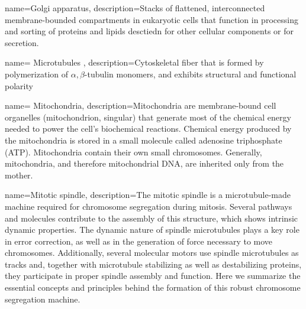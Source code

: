  {
	name={Golgi apparatus},
	description={Stacks of flattened, interconnected membrane-bounded compartments in eukaryotic cells that function in processing and sorting of proteins and lipids desctiedn for other cellular components or for secretion.\cite{lodish2003molecular}}}



 {
	name= {Microtubules} ,
	description={Cytoskeletal fiber that is formed by polymerization of $\alpha,\beta$-tubulin monomers, and exhibits structural and functional polarity\cite{lodish2003molecular}}}


 {
	name= {Mitochondria},
	description={Mitochondria are membrane-bound cell organelles (mitochondrion, singular) that generate most of the chemical energy needed to power the cell's biochemical reactions. Chemical energy produced by the mitochondria is stored in a small molecule called adenosine triphosphate (ATP). Mitochondria contain their own small chromosomes. Generally, mitochondria, and therefore mitochondrial DNA, are inherited only from the mother. }}


 {
	name={Mitotic spindle},
	description={The mitotic spindle is a microtubule-made machine required for chromosome segregation during mitosis. Several pathways and molecules contribute to the assembly of this structure, which shows intrinsic dynamic properties. The dynamic nature of spindle microtubules plays a key role in error correction, as well as in the generation of force necessary to move chromosomes. Additionally, several molecular motors use spindle microtubules as tracks and, together with microtubule stabilizing as well as destabilizing proteins, they participate in proper spindle assembly and function. Here we summarize the essential concepts and principles behind the formation of this robust chromosome segregation machine.}}

